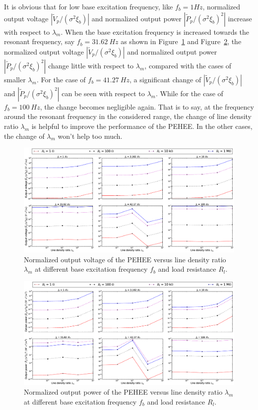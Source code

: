 \documentclass{elsarticle}
\begin{document}
It is obvious that for low base excitation frequency, like $f_b = 1 Hz$, normalized output voltage $|\tilde{V}_p/(\sigma^2 \xi_b)|$ and normalized output power $|\tilde{P}_p/(\sigma^2 \xi_b)^2|$ increase with respect to $\lambda_m$. When the base excitation frequency is increased towards the resonant frequency, say $f_b = 31.62 \ Hz$ as shown in Figure~\ref{fig:fig_vol_fr_sl_Rl_sl_vs_lamm} and Figure~\ref{fig:fig_pow_fr_sl_Rl_sl_vs_lamm}, the normalized output voltage $|\tilde{V}_p/(\sigma^2 \xi_b)|$ and normalized output power $|\tilde{P}_p/(\sigma^2 \xi_b)^2|$ change little with respect to $\lambda_m$, compared with the cases of smaller $\lambda_m$. For the case of $f_b = 41.27 \ Hz$, a significant change of $|\tilde{V}_p/(\sigma^2 \xi_b)|$ and $|\tilde{P}_p/(\sigma^2 \xi_b)^2|$ can be seen with respect to $\lambda_m$. While for the case of $f_b = 100 \ Hz$, the change becomes negligible again. That is to say, at the frequency around the resonant frequency in the considered range, the change of line density ratio $\lambda_m$ is helpful to improve the performance of the PEHEE. In the other cases, the change of $\lambda_m$ won't help too much.

\begin{figure}[!htbp]
    \centering
    \includegraphics[width=\textwidth]{./fig_vol_fr_sl_Rl_sl_vs_lamm}
    \caption{ Normalized output voltage of the PEHEE versus line density ratio $\lambda_m$ at different base excitation frequency $f_b$ and load resistance $R_l$. }
    \label{fig:fig_vol_fr_sl_Rl_sl_vs_lamm}
\end{figure}


\begin{figure}[!htbp]
    \centering
    \includegraphics[width=\textwidth]{./fig_pow_fr_sl_Rl_sl_vs_lamm}
    \caption{ Normalized output power of the PEHEE versus line density ratio $\lambda_m$ at different base excitation frequency $f_b$ and load resistance $R_l$. }
    \label{fig:fig_pow_fr_sl_Rl_sl_vs_lamm}
\end{figure}
\end{document}

